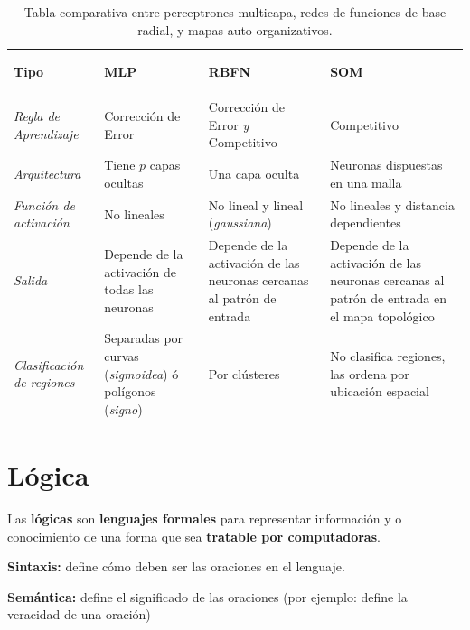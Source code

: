 \documentclass[10pt,a4paper]{article}
\begin{document}
\begin{table}[h]
\centering
\begin{tabular}{  p{2cm} | p{4cm} | p{4cm} | p{4cm}  }
\hline 
\begin{center} \textbf{Tipo} \end{center} & 
\begin{center} \textbf{MLP} \end{center} & 
\begin{center} \textbf{RBFN} \end{center}& 
\begin{center} \textbf{SOM} \end{center} \\
\rowcolor[gray]{.95} 
\textit{Regla de Aprendizaje}&
Corrección de Error &
Corrección de Error \textit{y} Competitivo &
Competitivo \\ 
\textit{Arquitectura}&
Tiene $p$ capas ocultas &
Una capa oculta &
Neuronas dispuestas en una malla \\ \rowcolor[gray]{.95} 
\textit{Función de activación} &
No lineales &
No lineal y lineal (\textit{gaussiana}) &
No lineales y distancia dependientes \\ 
\textit{Salida} &
Depende de la activación de todas las neuronas &
Depende de la activación de las neuronas cercanas al patrón de entrada &
Depende de la activación de las neuronas cercanas al patrón de entrada en el mapa topológico \\ \rowcolor[gray]{.95} 
\textit{Clasificación de regiones} &
Separadas por curvas (\textit{sigmoidea}) ó polígonos (\textit{signo}) &
Por clústeres &
No clasifica regiones, las ordena por ubicación espacial 
\\ \hline
\end{tabular}
\caption{Tabla comparativa entre perceptrones multicapa, redes de funciones de base radial, y mapas auto-organizativos.}
\label{tab:comparativo}
\end{table}

\section{Lógica}
Las \textbf{lógicas} son \textbf{lenguajes formales} para representar información y o conocimiento de una forma que sea \textbf{tratable por computadoras}.
\begin{description}
\item \textbf{Sintaxis:} define cómo deben ser las oraciones en el lenguaje.
\item \textbf{Semántica:} define el significado de las oraciones (por ejemplo: define la veracidad de una oración)
\end{description}
\end{document}
